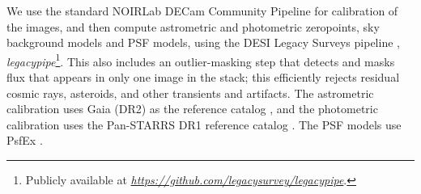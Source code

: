 \documentclass[11pt,letterpaper,linenumbers]{aastex63}
\newcommand{\niceurl}[1]{\mbox{\href{#1}{\textsl{#1}}}}
\begin{document}
% 

We use the standard NOIRLab DECam Community Pipeline \citep{cppipeline}
for calibration of the images, and then compute astrometric and
photometric zeropoints, sky background models and PSF models, using
the DESI Legacy Surveys pipeline \citep{lsoverview},
\textsl{legacypipe}\footnote{Publicly available at
\niceurl{https://github.com/legacysurvey/legacypipe}.}.
This also includes an outlier-masking step that detects and masks flux that
appears in only one image in the stack; this efficiently rejects residual cosmic
rays, asteroids, and other transients and artifacts.
The astrometric
calibration uses Gaia (DR2) as the reference catalog \citep{gaia,
  gaiaDR1}, and the photometric calibration uses the Pan-STARRS DR1
reference catalog \citep{panstarrs}.  The PSF models use PsfEx
\citep{psfex}.
\end{document}

